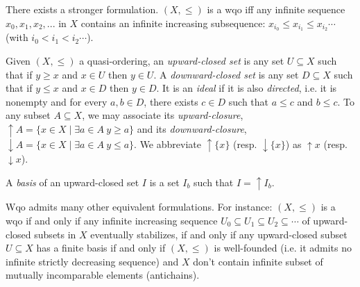 There exists a stronger formulation. $(X,\leq)$ is a wqo iff any infinite sequence  $x_0, x_1, x_2, ...$ in $X$ contains an infinite increasing subsequence: $x_{i_0} \leq x_{i_1} \leq x_{i_2} \cdots$ (with $i_0 < i_1 < i_2 \cdots$).

%
\iffalse
%
\begin{lemma}
(Erd\"os and Rado). Assume $\leq$ is a wqo. Then any infinite sequence contains an infinite increasing subsequence: $x_{i_0} \leq x_{i_1} \leq x_{i_2} \cdots$ (with $i_0 < i_1 < i_2 \cdots$).
\end{lemma}


\begin{proof}
Consider an infinite sequence and the set $M = \{i \in N \mid \forall j > i ~ x_i \not\leq x_j \}$. $M$ cannot
be infinite, otherwise it would lead to an infinite subsequence contradicting the wqo
hypothesis. Thus, $M$ is bounded and any $x_i$ with $i$ beyond $M$ can start an infinite
increasing subsequence.
\end{proof}
%
\fi
%

Given $(X,\leq)$ a quasi-ordering, an {\em upward-closed set} is any set $U \subseteq X$ such that if $y \geq x$ and $x \in U$ then $y \in U $.
A {\em downward-closed set} is any set $D \subseteq X$ such that if $y \leq x$ and $x \in D$ then $y \in D $. 
It is an {\em ideal } if it is also {\em directed}, i.e. it is nonempty and for every $a,b \in D$, there exists $c \in D$ such that $a \leq c$ and $b \leq c$.
To any subset $A \subseteq X$, we may associate
its {\em upward-closure},
 $\uparrow A = \{x \in X \mid \exists a \in A ~ y \geq a\}$
 and its 
 {\em downward-closure},
 $\downarrow A = \{x \in X \mid \exists a \in A ~ y \leq a\}$. 
We abbreviate $\uparrow \{x\}$ (resp. $\downarrow \{x\}$)
as $\uparrow x$ (resp. $\downarrow x$).


A {\em basis} of an upward-closed set $I$ is a set $I_b$ such that $I = \uparrow I_b$. 

Wqo admits many other equivalent formulations. For instance: 
$(X,\leq)$ is a wqo if and only if any infinite increasing sequence $U_0 \subseteq U_1 \subseteq U_2 \subseteq \cdots$ of
upward-closed subsets in $X$ eventually stabilizes, 
if and only if any upward-closed subset $U \subseteq X$ has a
finite basis if and only if $(X,\leq)$ is well-founded (i.e. it admits no infinite strictly decreasing sequence) and $X$ don't contain infinite subset of mutually incomparable elements (antichains).
%
\iffalse
%

